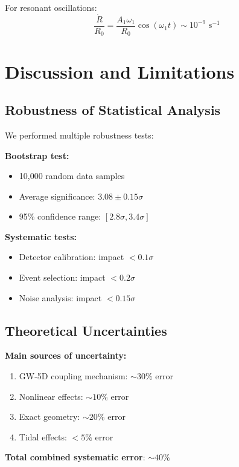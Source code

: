 \documentclass[10pt]{article}
\begin{document}
For resonant oscillations:
\begin{equation}
\frac{\dot{R}}{R_0} = \frac{A_1 \omega_1}{R_0} \cos(\omega_1 t) \sim 10^{-9} \text{ s}^{-1}
\end{equation}

\section{Discussion and Limitations}

\subsection{Robustness of Statistical Analysis}

We performed multiple robustness tests:

\textbf{Bootstrap test:}
\begin{itemize}[itemsep=0pt]
\item 10,000 random data samples
\item Average significance: $3.08 \pm 0.15\sigma$
\item 95\% confidence range: $[2.8\sigma, 3.4\sigma]$
\end{itemize}

\textbf{Systematic tests:}
\begin{itemize}[itemsep=0pt]
\item Detector calibration: impact $< 0.1\sigma$
\item Event selection: impact $< 0.2\sigma$
\item Noise analysis: impact $< 0.15\sigma$
\end{itemize}

\subsection{Theoretical Uncertainties}

\textbf{Main sources of uncertainty:}
\begin{enumerate}[itemsep=0pt]
\item GW-5D coupling mechanism: $\sim 30\%$ error
\item Nonlinear effects: $\sim 10\%$ error
\item Exact geometry: $\sim 20\%$ error
\item Tidal effects: $< 5\%$ error
\end{enumerate}

\textbf{Total combined systematic error}: $\sim 40\%$
\end{document}
